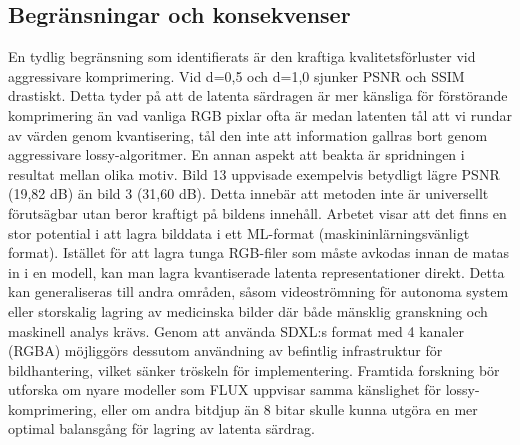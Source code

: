 \subsection*{Begränsningar och konsekvenser}
En tydlig begränsning som identifierats är den kraftiga kvalitetsförluster vid aggressivare komprimering. Vid d=0,5 och d=1,0 sjunker PSNR och SSIM drastiskt. Detta tyder på att de latenta särdragen är mer känsliga för förstörande komprimering än vad vanliga RGB pixlar ofta är medan latenten tål att vi rundar av värden genom kvantisering, tål den inte att information gallras bort genom aggressivare lossy-algoritmer.
En annan aspekt att beakta är spridningen i resultat mellan olika motiv. Bild 13 uppvisade exempelvis betydligt lägre PSNR (19,82 dB) än bild 3 (31,60 dB). Detta innebär att metoden inte är universellt förutsägbar utan beror kraftigt på bildens innehåll.
Arbetet visar att det finns en stor potential i att lagra bilddata i ett ML-format (maskininlärningsvänligt format). Istället för att lagra tunga RGB-filer som måste avkodas innan de matas in i en modell, kan man lagra kvantiserade latenta representationer direkt. Detta kan generaliseras till andra områden, såsom videoströmning för autonoma system eller storskalig lagring av medicinska bilder där både mänsklig granskning och maskinell analys krävs. Genom att använda SDXL:s format med 4 kanaler (RGBA) möjliggörs dessutom användning av befintlig infrastruktur för bildhantering, vilket sänker tröskeln för implementering.
Framtida forskning bör utforska om nyare modeller som FLUX uppvisar samma känslighet för lossy-komprimering, eller om andra bitdjup än 8 bitar skulle kunna utgöra en mer optimal balansgång för lagring av latenta särdrag.

